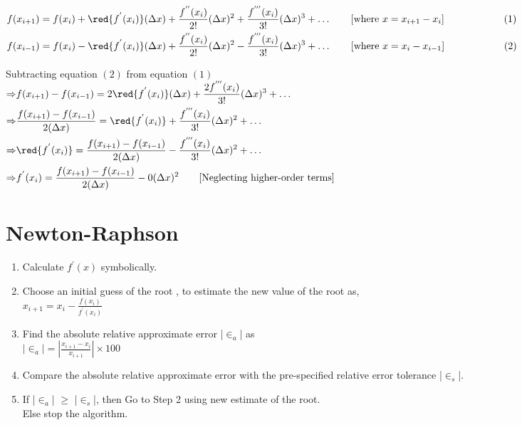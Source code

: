 \vspace{-1.5\baselineskip}
$\begin{aligned}
   & f(x_{i+1}) = f(x_i) + \red{f^{'}(x_i)}(\Delta x) + \frac{f^{''}(x_i)}{2!}(\Delta x)^2 + \frac{f^{'''}(x_i)}{3!}(\Delta x)^3 + \ldots \quad \quad [\text{where } x = x_{i+1} - x_i]
   \quad \quad \quad \quad \quad \quad (1)\\
   & f(x_{i-1}) = f(x_i) - \red{f^{'}(x_i)}(\Delta x) + \frac{f^{''}(x_i)}{2!}(\Delta x)^2 - \frac{f^{'''}(x_i)}{3!}(\Delta x)^3 + \ldots \quad \quad [\text{where } x = x_i - x_{i-1}]
   \quad \quad \quad \quad \quad \quad (2)\\[1em]
\end{aligned}$\\
% 
Subtracting equation $(2)$ from equation $(1)$\\[0.5em]
$\begin{aligned}
   \Rightarrow & f(x_{i+1}) - f(x_{i-1}) = 2\red{f^{'}(x_i)}(\Delta x) + \frac{2f^{'''}(x_i)}{3!}(\Delta x)^3 +\ldots\\
   \Rightarrow & \frac{f(x_{i+1}) - f(x_{i-1})}{2(\Delta x)} = \red{f^{'}(x_i)} + \frac{f^{'''}(x_i)}{3!}(\Delta x)^2+\ldots\\
   \Rightarrow & \red{f^{'}(x_i)} = \frac{f(x_{i+1}) - f(x_{i-1})}{2(\Delta x)} - \frac{f^{'''}(x_i)}{3!}(\Delta x)^2+\ldots\\
   \Rightarrow & f^{'}(x_i) = \frac{f(x_{i+1}) - f(x_{i-1})}{2(\Delta x)} - {0}(\Delta x)^2 \quad \quad [\text{Neglecting higher-order terms}]\\
\end{aligned}$

\pagebreak
\section*{Newton-Raphson}
\begin{enumerate}[label=\textbf{\textit{Step-\arabic*}} :, left=0pt, itemindent=0pt, parsep=0.5em]
   \item Calculate  $f^{'}(x)$ symbolically.
   \item Choose an initial guess of the root , to estimate the new
   value of the root  as,\\[0.5em]
   $x_{i+1} = x_i - \frac{f(x_i)}{f^{'}(x_i)}$
   \vspace{0.2em}
   \item Find the absolute relative approximate error |$\in_{a}$| as \\[0.5em]
   $|\in_{a}| = \left| \frac{x_{i+1} - x_i}{x_{i+1}} \right| \times 100$
   \vspace{0.2em}
   \item Compare the absolute relative approximate error with the pre-specified relative error tolerance |$\in_{s}$|.
   \item If |$\in_{a}$| $\geq$ |$\in_{s}$|, then Go to Step 2 using new
   estimate of the root.\\
   Else stop the algorithm.
\end{enumerate}

